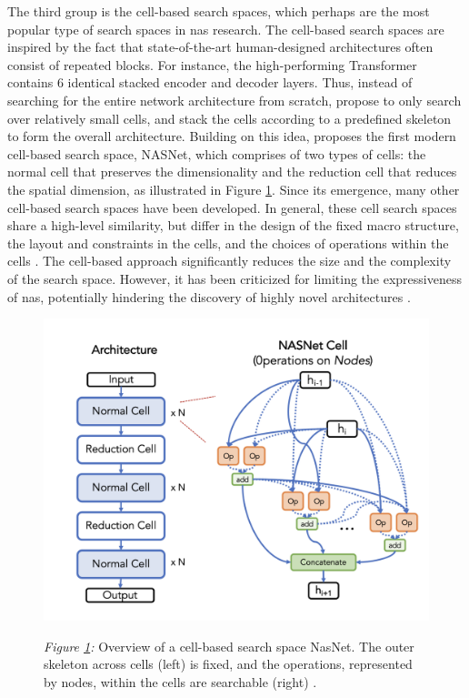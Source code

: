\documentclass[a4paper,oneside,bibliography=totoc]{scrbook}
\begin{document}
\begin{description}[leftmargin=0cm, listparindent=\parindent]
		The third group is the cell-based search spaces, which perhaps are the most popular type of search spaces in \gls{nas} research. The cell-based search spaces are inspired by the fact that state-of-the-art human-designed architectures often consist of repeated blocks. For instance, the high-performing Transformer \cite{vaswani2017attention} contains 6 identical stacked encoder and decoder layers. Thus, instead of searching for the entire network architecture from scratch, \cite{zoph2018learning} propose to only search over relatively small cells, and stack the cells according to a predefined skeleton to form the overall architecture. Building on this idea, \cite{zoph2018learning} proposes the first modern cell-based search space, NASNet, which comprises of two types of cells: the normal cell that preserves the dimensionality and the reduction cell that reduces the spatial dimension, as illustrated in Figure \ref{fig: cellss}. Since its emergence, many other cell-based search spaces have been developed. In general, these cell search spaces share a high-level similarity, but differ in the design of the fixed macro structure, the layout and constraints in the cells, and the choices of operations within the cells \cite{dong2020nasbench201, liu2018darts,  pmlr-v97-ying19a}. The cell-based approach significantly reduces the size and the complexity of the search space. However, it has been criticized for limiting the expressiveness of \gls{nas}, potentially hindering the discovery of highly novel architectures \cite{white2023survey}.	
		
		\begin{figure}[htbp]
			\centering
			\includegraphics[scale=0.45]{figs/overview_cell_based_ss.png}
			\label{fig: cellss}
			\parbox{\linewidth}{
	 		\vspace{0.5em}
 	 		{\small \textit{Figure \ref{fig: cellss}:} Overview of a cell-based search space NasNet. The outer skeleton across cells (left) is fixed, and the operations, represented by nodes, within the cells are searchable (right) \cite{white2023survey}.
			}
 		}
		\end{figure}
		

\end{description}
\end{document}
